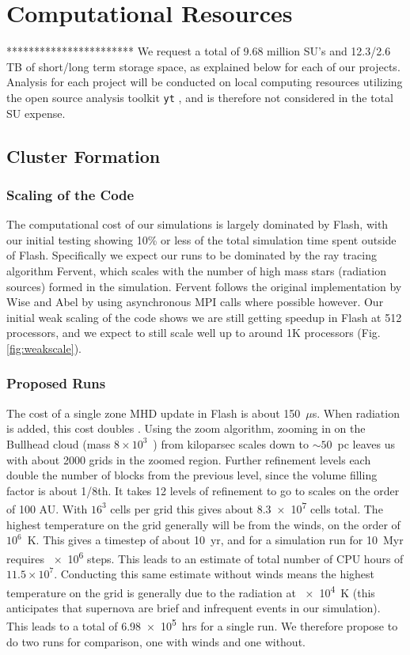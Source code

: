 \documentclass[11pt]{article}
\begin{document}
\section{Computational Resources}
***********************
We request a total of 9.68 million SU's and 12.3/2.6 TB of short/long term storage space, as explained below for each of our projects. Analysis for each project will be conducted on local computing resources utilizing the open source analysis toolkit \texttt{yt} \citep{yt}, and is therefore not considered in the total SU expense.

\subsection{Cluster Formation}

\subsubsection{Scaling of the Code}

The computational cost of our simulations is largely dominated by Flash, with our initial testing showing 10\% or less of the total simulation time spent outside of Flash. Specifically we expect our runs to be dominated by the ray tracing algorithm Fervent, which scales with the number of high mass stars (radiation sources) formed in the simulation. Fervent follows the original implementation by Wise and Abel \citep{wise_enzo+moray:_2011} by using asynchronous MPI calls where possible however. Our initial weak scaling of the code shows we are still getting speedup in Flash at 512 processors, and we expect to still scale well up to around 1K processors (Fig. \ref{fig:weakscale}).

\subsubsection{Proposed Runs}

The cost of a single zone MHD update in Flash is about 150~$\mu$s. When radiation is added, this cost doubles \citep{wise_enzo+moray:_2011}. Using the zoom algorithm, zooming in on the Bullhead cloud (mass $8 \times 10^3$~{\msun}) from kiloparsec scales down to $\sim50$~pc leaves us with about 2000 grids in the zoomed region. Further refinement levels each double the number of blocks from the previous level, since the volume filling factor is about 1/8th. It takes 12 levels of refinement to go to scales on the order of 100 \si{AU}. With $16^3$ cells per grid this gives about \num{8.3e7} cells total. The highest temperature on the grid generally will be from the winds, on the order of $10^6$~K. This gives a timestep of about 10~yr, and for a simulation run for 10~Myr requires \num{e6} steps. This leads to an estimate of total number of CPU hours of $11.5 \times 10^7$. Conducting this same estimate without winds means the highest temperature on the grid is generally due to the radiation at \SI{e4}{K} (this anticipates that supernova are brief and infrequent events in our simulation). This leads to a total of \SI{6.98e5}{hrs} for a single run. We therefore propose to do two runs for comparison, one with winds and one without.
\end{document}
